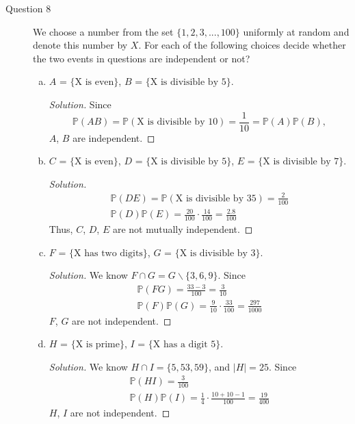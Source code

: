 \documentclass[addpoints, 11pt]{exam}
\newcommand*{\prob}{\mathds{P}}
\begin{document}
\begin{description}
    \newpage

    \item[Question 8] We choose a number from the set $\{1, 2, 3, . . . , 100\}$ uniformly at random and denote this number by $X$. For each of the following choices decide whether the two events in questions are independent or not?

    \begin{enumerate}[(a)]
        \item  $A$ = $\{\text{X is even}\}$, $B$ = $\{\text{X is divisible by 5}\}$.

        \begin{proof}[Solution]
        Since
            \[
                \prob(AB) = \prob(\text{X is divisible by 10}) = \frac{1}{10} = \prob(A)\prob(B),
            \]
            $A$, $B$ are independent.
        \end{proof}

        \item  $C$ = $\{\text{X is even}\}$, $D$ = $\{\text{X is divisible by 5}\}$, $E$ = $\{\text{X is divisible by 7}\}$.

        \begin{proof}[Solution]
        \begin{gather}
            \prob(DE) = \prob(\text{X is divisible by 35}) = \frac{2}{100} \\
            \prob(D)\prob(E) = \frac{20}{100} \cdot \frac{14}{100} = \frac{2.8}{100}
        \end{gather}
        Thus, $C$, $D$, $E$ are not mutually independent.
        \end{proof}

        \item  $F$ = $\{\text{X has two digits}\}$, $G$ = $\{\text{X is divisible by 3}\}$.

        \begin{proof}[Solution]
        We know $F \cap G = G \backslash \{3, 6, 9\}$. Since
            \begin{gather}
                \prob(FG) = \frac{33 - 3}{100} = \frac{3}{10} \\
                \prob(F)\prob(G) = \frac{9}{10} \cdot \frac{33}{100} = \frac{297}{1000}
            \end{gather}
            $F$, $G$ are not independent.
        \end{proof}

        \item  $H$ = $\{\text{X is prime}\}$, $I$ = $\{\text{X has a digit 5}\}$.

        \begin{proof}[Solution]
        We know $H \cap I = \{5, 53, 59\}$, and $|H| = 25$. Since
            \begin{gather}
                \prob(HI) = \frac{3}{100} \\
                \prob(H)\prob(I) = \frac{1}{4} \cdot \frac{10 + 10 - 1}{100} = \frac{19}{400}
            \end{gather}
            $H$, $I$ are not independent.
        \end{proof}
    \end{enumerate}
    
\end{description}
\end{document}

